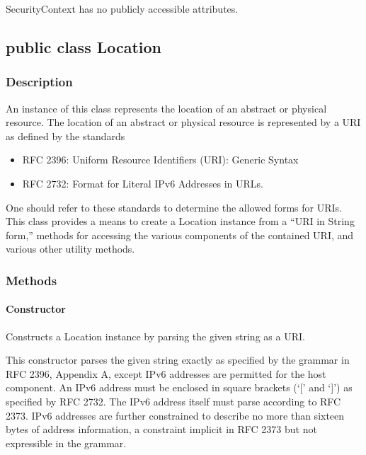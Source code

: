 \documentclass[$Date: 2003/06/26 19:29:31 $]{glabarticle}
\begin{document}
SecurityContext has no publicly accessible attributes.


\newpage

\subsection{public class Location}


\subsubsection{Description}

An instance of this class represents the location of an abstract or physical resource. The location of an
abstract or physical resource is represented by a URI as defined by the standards
\begin{itemize}
  \item RFC 2396: Uniform Resource Identifiers (URI): Generic Syntax
  \item RFC 2732: Format for Literal IPv6 Addresses in URLs.
\end{itemize}
One should refer to these standards to determine the allowed forms for URIs. This class provides a means
to create a Location instance from a ``URI in String form,'' methods for accessing the various components 
of the contained URI, and various other utility methods.


\subsubsection{Methods}

\paragraph{Constructor}

Constructs a Location  instance by parsing the given string as a URI.

This constructor parses the given string exactly as specified by the
grammar in RFC 2396, Appendix A, except IPv6 addresses are permitted
for the host component. An IPv6 address must be enclosed in square
brackets (`[' and `]') as specified by RFC 2732. The IPv6 address
itself must parse according to RFC 2373. IPv6 addresses are further
constrained to describe no more than sixteen bytes of address
information, a constraint implicit in RFC 2373 but not expressible in
the grammar. \\
\end{document}
